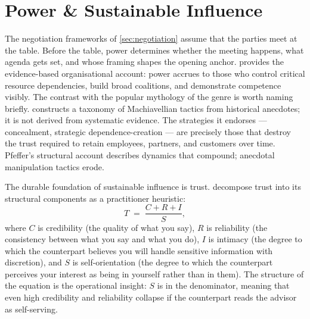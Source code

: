 \section{Power \& Sustainable Influence}\label{sec:power-trust}

The negotiation frameworks of \cref{sec:negotiation} assume that the parties meet at the
table. Before the table, power determines whether the meeting happens, what agenda gets
set, and whose framing shapes the opening anchor. \textcite{pfeffer2010power} provides the
evidence-based organisational account: power accrues to those who control critical resource
dependencies, build broad coalitions, and demonstrate competence visibly. The contrast with
the popular mythology of the genre is worth naming briefly. \textcite{greene1998laws}
constructs a taxonomy of Machiavellian tactics from historical anecdotes; it is not
derived from systematic evidence. The strategies it endorses --- concealment, strategic
dependence-creation --- are precisely those that destroy the trust required to retain
employees, partners, and customers over time. Pfeffer's structural account describes
dynamics that compound; anecdotal manipulation tactics erode.

The durable foundation of sustainable influence is trust. \textcite{maister2000trusted}
decompose trust into its structural components as a practitioner heuristic:
\begin{equation}\label{eq:trust}
  T \;=\; \frac{C + R + I}{S},
\end{equation}
where \(C\) is credibility (the quality of what you say), \(R\) is reliability (the
consistency between what you say and what you do), \(I\) is intimacy (the degree to which
the counterpart believes you will handle sensitive information with discretion), and \(S\)
is self-orientation (the degree to which the counterpart perceives your interest as being
in yourself rather than in them). The structure of the equation is the operational insight:
\(S\) is in the denominator, meaning that even high credibility and reliability collapse
if the counterpart reads the advisor as self-serving.

